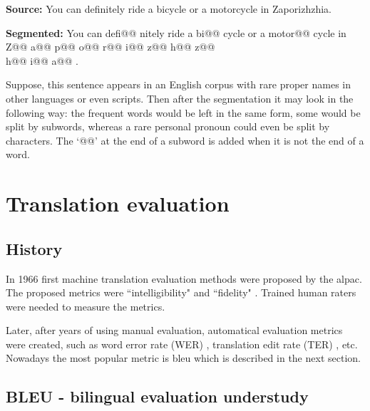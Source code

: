 \vspace{\baselineskip}
\begin{minipage}[t]{0.9\textwidth}

\textbf{Source:} You can definitely ride a bicycle or a motorcycle in
	Zaporizhzhia.

\textbf{Segmented:} You can defi@@ nitely ride a bi@@ cycle or a motor@@
	cycle in Z@@ a@@ p@@ o@@ r@@ i@@ z@@ h@@ z@@ \\
	h@@ i@@ a@@ .


	\begin{exmp}
	Suppose, this sentence appears in an English corpus with rare
	proper names in other languages or even scripts.
    Then after the segmentation it may look in the following way:
	the frequent words would be left in the same form, some would be split
	by subwords, whereas a rare personal pronoun could even be split by characters.
	The `@@' at the end of a subword is added when it is not
	the end of a word.
	\label{exmp:bpe_segmentation}
	\end{exmp}

\end{minipage}
\vspace{\baselineskip}


\section{Translation evaluation}

\subsection{History}

In 1966 first machine translation evaluation methods were proposed
by the \acrfull{alpac}.
The proposed metrics were ``intelligibility" and ``fidelity"
\citep[p~67]{Translation1966}.
Trained human raters were needed to measure the metrics.

Later, after years of using manual evaluation, automatical evaluation
metrics were created, such as word error rate (WER) \cite{Su1992},
translation edit rate (TER) \cite{Snover2006}, etc.
Nowadays the most popular metric is \acrfull{bleu} which is described
in the next section.


\subsection{BLEU - bilingual evaluation understudy}

